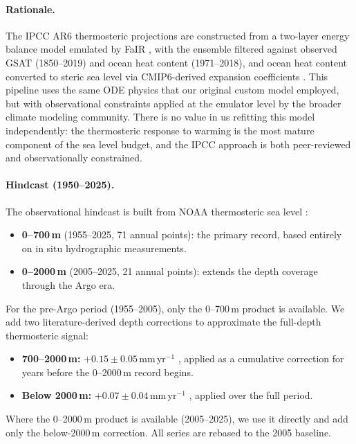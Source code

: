 \documentclass[11pt]{article}
\begin{document}
\paragraph{Rationale.}
The IPCC AR6 thermosteric projections are constructed from a two-layer energy balance model \citep{Geoffroy2013} emulated by FaIR \citep{Smith2019}, with the ensemble filtered against observed GSAT (1850--2019) and ocean heat content (1971--2018), and ocean heat content converted to steric sea level via CMIP6-derived expansion coefficients \citep{Kuhlbrodt2012, Fox-Kemper2021}. This pipeline uses the same ODE physics that our original custom model employed, but with observational constraints applied at the emulator level by the broader climate modeling community. There is no value in us refitting this model independently: the thermosteric response to warming is the most mature component of the sea level budget, and the IPCC approach is both peer-reviewed and observationally constrained.

\paragraph{Hindcast (1950--2025).}
The observational hindcast is built from NOAA thermosteric sea level \citep{Levitus2012}:
\begin{itemize}
	\item \textbf{0--700\,m} (1955--2025, 71 annual points): the primary record, based entirely on in situ hydrographic measurements.
	\item \textbf{0--2000\,m} (2005--2025, 21 annual points): extends the depth coverage through the Argo era.
\end{itemize}
For the pre-Argo period (1955--2005), only the 0--700\,m product is available. We add two literature-derived depth corrections to approximate the full-depth thermosteric signal:
\begin{itemize}
	\item \textbf{700--2000\,m:} $+0.15 \pm 0.05$\,mm\,yr$^{-1}$ \citep{Levitus2012, Cheng2017}, applied as a cumulative correction for years before the 0--2000\,m record begins.
	\item \textbf{Below 2000\,m:} $+0.07 \pm 0.04$\,mm\,yr$^{-1}$ \citep{Purkey2010, Desbruyeres2016}, applied over the full period.
\end{itemize}
Where the 0--2000\,m product is available (2005--2025), we use it directly and add only the below-2000\,m correction. All series are rebased to the 2005 baseline.
\end{document}
